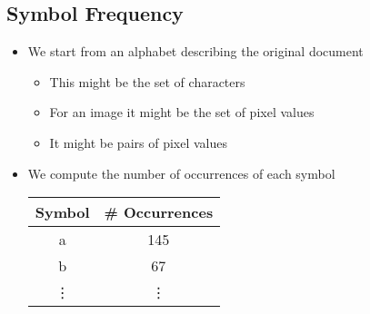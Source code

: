 
\begin{slide}
\section[-1]{Symbol Frequency}

\begin{PauseHighLight}
  \begin{itemize}
  \item We start from an alphabet describing the original document\pause
    \begin{itemize}
    \item This might be the set of characters\pause
    \item For an image it might be the set of pixel values\pause
    \item It might be pairs of pixel values\pause
    \end{itemize}
  \item We compute the number of occurrences of each symbol
    \begin{center}
      \begin{tabular}{|c|c|} \hline
        Symbol & \# Occurrences \\ \hline
        a & 145 \\ \hline
        b & 67  \\ \hline
        \vdots & \vdots  \\ \hline
      \end{tabular}\pause
    \end{center}
  \end{itemize}
\end{PauseHighLight}

\end{slide}



